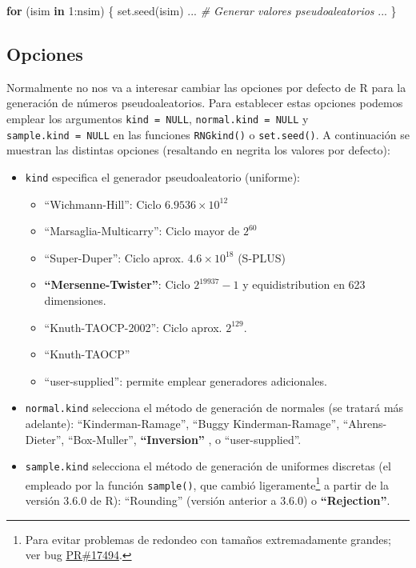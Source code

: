 \documentclass[
]{book}
\newenvironment{Shaded}{\begin{snugshade}}{\end{snugshade}}
\newcommand{\CommentTok}[1]{\textcolor[rgb]{0.56,0.35,0.01}{\textit{#1}}}
\newcommand{\ControlFlowTok}[1]{\textcolor[rgb]{0.13,0.29,0.53}{\textbf{#1}}}
\newcommand{\DecValTok}[1]{\textcolor[rgb]{0.00,0.00,0.81}{#1}}
\newcommand{\FunctionTok}[1]{\textcolor[rgb]{0.00,0.00,0.00}{#1}}
\newcommand{\NormalTok}[1]{#1}
\newcommand{\SpecialCharTok}[1]{\textcolor[rgb]{0.00,0.00,0.00}{#1}}
\theoremstyle{break}
\theoremstyle{nonumberplain}
\begin{document}
\begin{Shaded}
\begin{Highlighting}[]
\ControlFlowTok{for}\NormalTok{ (isim }\ControlFlowTok{in} \DecValTok{1}\SpecialCharTok{:}\NormalTok{nsim) \{}
  \FunctionTok{set.seed}\NormalTok{(isim)}
\NormalTok{  ...}
  \CommentTok{\# Generar valores pseudoaleatorios}
\NormalTok{  ...}
\NormalTok{\}}
\end{Highlighting}
\end{Shaded}

\hypertarget{oprrng}{%
\subsection{Opciones}\label{oprrng}}

Normalmente no nos va a interesar cambiar las opciones por defecto de R para la generación de números pseudoaleatorios.
Para establecer estas opciones podemos emplear los argumentos \texttt{kind\ =\ NULL}, \texttt{normal.kind\ =\ NULL} y \texttt{sample.kind\ =\ NULL} en las funciones \texttt{RNGkind()} o \texttt{set.seed()}.
A continuación se muestran las distintas opciones (resaltando en negrita los valores por defecto):

\begin{itemize}
\item
  \texttt{kind} especifica el generador pseudoaleatorio (uniforme):

  \begin{itemize}
  \item
    ``Wichmann-Hill'': Ciclo \(6.9536\times10^{12}\)
  \item
    ``Marsaglia-Multicarry'': Ciclo mayor de \(2^{60}\)
  \item
    ``Super-Duper'': Ciclo aprox. \(4.6\times10^{18}\) (S-PLUS)
  \item
    \textbf{``Mersenne-Twister''}: Ciclo \(2^{19937}-1\) y equidistribution
    en 623 dimensiones.
  \item
    ``Knuth-TAOCP-2002'': Ciclo aprox. \(2^{129}\).
  \item
    ``Knuth-TAOCP''
  \item
    ``user-supplied'': permite emplear generadores adicionales.
  \end{itemize}
\item
  \texttt{normal.kind} selecciona el método de generación de normales
  (se tratará más adelante):
  ``Kinderman-Ramage'', ``Buggy Kinderman-Ramage'',
  ``Ahrens-Dieter'', ``Box-Muller'', \textbf{``Inversion''} , o ``user-supplied''.
\item
  \texttt{sample.kind} selecciona el método de generación de uniformes discretas (el empleado por la función \texttt{sample()}, que cambió ligeramente\footnote{Para evitar problemas de redondeo con tamaños extremadamente grandes; ver bug \href{https://bugs.r-project.org/bugzilla3/show_bug.cgi?id=17494}{PR\#17494}.} a partir de la versión 3.6.0 de R): ``Rounding'' (versión anterior a 3.6.0) o \textbf{``Rejection''}.
\end{itemize}
\end{document}

